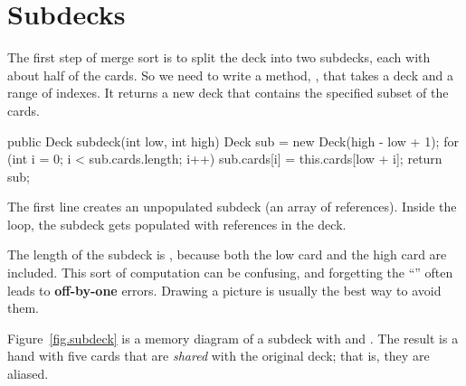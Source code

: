 \section{Subdecks}


The first step of merge sort is to split the deck into two subdecks, each with about half of the cards.
So we need to write a method, , that takes a deck and a range of indexes.
It returns a new deck that contains the specified subset of the cards.

\begin{code}
public Deck subdeck(int low, int high) {
    Deck sub = new Deck(high - low + 1);
    for (int i = 0; i < sub.cards.length; i++) {
        sub.cards[i] = this.cards[low + i];
    }
    return sub;
}
\end{code}

The first line creates an unpopulated subdeck (an array of  references).
Inside the  loop, the subdeck gets populated with references in the deck.


The length of the subdeck is , because both the low card and the high card are included.
This sort of computation can be confusing, and forgetting the ``'' often leads to {\bf off-by-one} errors.
Drawing a picture is usually the best way to avoid them.

%


Figure~\ref{fig.subdeck} is a memory diagram of a subdeck with  and .
The result is a hand with five cards that are {\em shared} with the original deck; that is, they are aliased.

